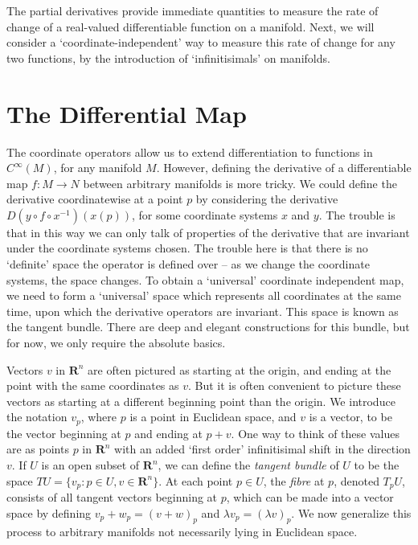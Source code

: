 The partial derivatives provide immediate quantities to measure the rate of change of a real-valued differentiable function on a manifold. Next, we will consider a `coordinate-independent' way to measure this rate of change for any two functions, by the introduction of `infinitisimals' on manifolds.

\section{The Differential Map}

The coordinate operators allow us to extend differentiation to functions in $C^\infty(M)$, for any manifold $M$. However, defining the derivative of a differentiable map $f: M \to N$ between arbitrary manifolds is more tricky. We could define the derivative coordinatewise at a point $p$ by considering the derivative $D(y \circ f \circ x^{-1})(x(p))$, for some coordinate systems $x$ and $y$. The trouble is that in this way we can only talk of properties of the derivative that are invariant under the coordinate systems chosen. The trouble here is that there is no `definite' space the operator is defined over -- as we change the coordinate systems, the space changes. To obtain a `universal' coordinate independent map, we need to form a `universal' space which represents all coordinates at the same time, upon which the derivative operators are invariant. This space is known as the tangent bundle. There are deep and elegant constructions for this bundle, but for now, we only require the absolute basics.

Vectors $v$ in $\mathbf{R}^n$ are often pictured as starting at the origin, and ending at the point with the same coordinates as $v$. But it is often convenient to picture these vectors as starting at a different beginning point than the origin. We introduce the notation $v_p$, where $p$ is a point in Euclidean space, and $v$ is a vector, to be the vector beginning at $p$ and ending at $p + v$. One way to think of these values are as points $p$ in $\mathbf{R}^n$ with an added `first order' infinitisimal shift in the direction $v$. If $U$ is an open subset of $\mathbf{R}^n$, we can define the \emph{tangent bundle} of $U$ to be the space $TU = \{ v_p : p \in U, v \in \mathbf{R}^n \}$. At each point $p \in U$, the \emph{fibre} at $p$, denoted $T_pU$, consists of all tangent vectors beginning at $p$, which can be made into a vector space by defining $v_p + w_p = (v + w)_p$ and $\lambda v_p = (\lambda v)_p$. We now generalize this process to arbitrary manifolds not necessarily lying in Euclidean space.

